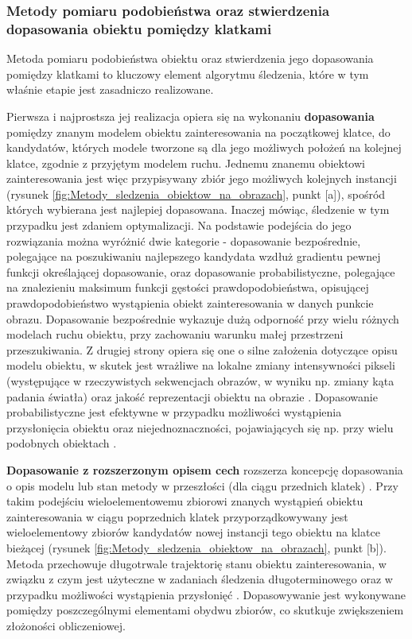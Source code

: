 \subsubsection{Metody pomiaru podobieństwa oraz stwierdzenia dopasowania obiektu pomiędzy klatkami}
\label{subsubsec:Metody_pomiaru_podobienstwa_oraz_stwierdzenia_dopasowania_obiektu pomiedzy_klatkami}

Metoda pomiaru podobieństwa obiektu oraz stwierdzenia jego dopasowania pomiędzy klatkami to kluczowy element algorytmu śledzenia, które w tym właśnie etapie jest zasadniczo realizowane.

Pierwsza i najprostsza jej realizacja opiera się na wykonaniu \textbf{dopasowania} pomiędzy znanym modelem obiektu zainteresowania na początkowej klatce, do kandydatów, których modele tworzone są dla jego możliwych położeń na kolejnej klatce, zgodnie z przyjętym modelem ruchu. Jednemu znanemu obiektowi zainteresowania jest więc przypisywany zbiór jego możliwych kolejnych instancji (rysunek \ref{fig:Metody_sledzenia_obiektow_na_obrazach}, punkt [a]), spośród których wybierana jest najlepiej dopasowana.
Inaczej mówiąc, śledzenie w tym przypadku jest zdaniem optymalizacji. Na podstawie podejścia do jego rozwiązania można wyróżnić dwie kategorie - dopasowanie bezpośrednie, polegające na poszukiwaniu najlepszego kandydata wzdłuż gradientu pewnej funkcji określającej dopasowanie, oraz dopasowanie probabilistyczne, polegające na znalezieniu maksimum funkcji gęstości prawdopodobieństwa, opisującej prawdopodobieństwo wystąpienia obiekt zainteresowania w danych punkcie obrazu. Dopasowanie bezpośrednie wykazuje dużą odporność przy wielu różnych modelach ruchu obiektu, przy zachowaniu warunku małej przestrzeni przeszukiwania. Z drugiej strony opiera się one o silne założenia dotyczące opisu modelu obiektu, w skutek jest wrażliwe na lokalne zmiany intensywności pikseli (występujące w rzeczywistych sekwencjach obrazów, w wyniku np. zmiany kąta padania światła) oraz jakość reprezentacji obiektu na obrazie \cite{Smeulders2010}. Dopasowanie probabilistyczne jest efektywne w przypadku możliwości wystąpienia przysłonięcia obiektu oraz niejednoznaczności, pojawiających się np. przy wielu podobnych obiektach \cite{Smeulders2010}.

\textbf{Dopasowanie z rozszerzonym opisem cech} rozszerza koncepcję dopasowania o opis modelu lub stan metody w przeszłości (dla ciągu przednich klatek) \cite{Smeulders2010}. Przy takim podejściu wieloelementowemu zbiorowi znanych wystąpień obiektu zainteresowania w ciągu poprzednich klatek przyporządkowywany jest wieloelementowy zbiorów kandydatów nowej instancji tego obiektu na klatce bieżącej (rysunek \ref{fig:Metody_sledzenia_obiektow_na_obrazach}, punkt [b]). Metoda przechowuje długotrwale trajektorię stanu obiektu zainteresowania, w związku z czym jest użyteczne w zadaniach śledzenia długoterminowego oraz w przypadku możliwości wystąpienia przysłonięć \cite{Smeulders2010}. Dopasowywanie jest wykonywane pomiędzy poszczególnymi elementami obydwu zbiorów, co skutkuje zwiększeniem złożoności obliczeniowej. 

